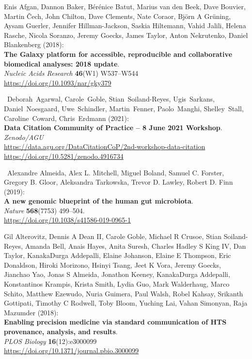 
\begin{thebibliography}{9}

 Enis Afgan, Dannon Baker, Bérénice Batut, Marius van
den Beek, Dave Bouvier, Martin Čech, John Chilton, Dave Clements, Nate
Coraor, Björn A Grüning, Aysam Guerler, Jennifer Hillman-Jackson, Saskia
Hiltemann, Vahid Jalili, Helena Rasche, Nicola Soranzo, Jeremy Goecks,
James Taylor, Anton Nekrutenko, Daniel Blankenberg (2018):\\
\textbf{The Galaxy platform for accessible, reproducible and
collaborative biomedical analyses: 2018 update}.\\
\emph{Nucleic Acids Research} \textbf{46}(W1) W537--W544\\
\url{https://doi.org/10.1093/nar/gky379}

~Deborah~Agarwal, Carole~Goble, Stian~Soiland-Reyes,
Ugis~Sarkans, Daniel~Noesgaard, Uwe~Schindler, Martin~Fenner,
Paolo~Manghi, Shelley~Stall, Caroline~Coward, Chris~Erdmann (2021):\\
\textbf{Data Citation Community of Practice -- 8 June 2021 Workshop}.\\
\emph{Zenodo/AGU}\\
\url{https://data.agu.org/DataCitationCoP/2nd-workshop-data-citation}~\\
\url{https://doi.org/10.5281/zenodo.4916734}

~Alexandre Almeida, Alex L. Mitchell, Miguel Boland, Samuel C.
Forster, Gregory B. Gloor, Aleksandra Tarkowska, Trevor D. Lawley,
Robert D. Finn (2019):\\
\textbf{A new genomic blueprint of the human gut microbiota}.\\
\emph{Nature} \textbf{568}(7753) 499--504.\\
\url{https://doi.org/10.1038/s41586-019-0965-1}

 Gil Alterovitz, Dennis A Dean II, Carole Goble, Michael R
Crusoe, Stian Soiland-Reyes, Amanda Bell, Anais Hayes, Anita Suresh,
Charles Hadley S King IV, Dan Taylor, KanakaDurga Addepalli, Elaine
Johanson, Elaine E Thompson, Eric Donaldson, Hiroki Morizono, Hsinyi
Tsang, Jeet K Vora, Jeremy Goecks, Jianchao Yao, Jonas S Almeida,
Jonathon Keeney, KanakaDurga Addepalli, Konstantinos Krampis, Krista
Smith, Lydia Guo, Mark Walderhaug, Marco Schito, Matthew Ezewudo, Nuria
Guimera, Paul Walsh, Robel Kahsay, Srikanth Gottipati, Timothy C
Rodwell, Toby Bloom, Yuching Lai, Vahan Simonyan, Raja Mazumder
(2018):\\
\textbf{Enabling precision medicine via standard communication of HTS
provenance, analysis, and results}.\\
\emph{PLOS Biology} \textbf{16}(12):e3000099\\
\url{https://doi.org/10.1371/journal.pbio.3000099}


\end{thebibliography}
